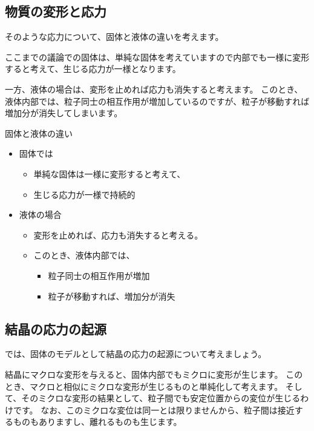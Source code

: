 \documentclass[uplatex,dvipdfmx,a4paper,11pt]{jsarticle}
\begin{document}
\subsection{物質の変形と応力}

そのような応力について、固体と液体の違いを考えます。

ここまでの議論での固体は、単純な固体を考えていますので内部でも一様に変形すると考えて、生じる応力が一様となります。

一方、液体の場合は、変形を止めれば応力も消失すると考えます。
このとき、液体内部では、粒子同士の相互作用が増加しているのですが、粒子が移動すれば増加分が消失してしまいます。
\large
\begin{itembox}[l]{固体と液体の違い}
	\begin{itemize}
		\item 固体では
		\begin{itemize}
			\item 単純な固体は一様に変形すると考えて、
			\item 生じる応力が一様で持続的
		\end{itemize}
		\item 液体の場合
		\begin{itemize}
			\item 変形を止めれば、応力も消失すると考える。
			\item このとき、液体内部では、
			\begin{itemize}
				\item 粒子同士の相互作用が増加
				\item 粒子が移動すれば、増加分が消失
			\end{itemize}
		\end{itemize}
	\end{itemize}
\end{itembox}
\normalsize

\subsection{結晶の応力の起源}

では、固体のモデルとして結晶の応力の起源について考えましょう。

結晶にマクロな変形を与えると、固体内部でもミクロに変形が生じます。
このとき、マクロと相似にミクロな変形が生じるものと単純化して考えます。
そして、そのミクロな変形の結果として、粒子間でも安定位置からの変位が生じるわけです。
なお、このミクロな変位は同一とは限りませんから、粒子間は接近するものもありますし、離れるものも生じます。
\end{document}
